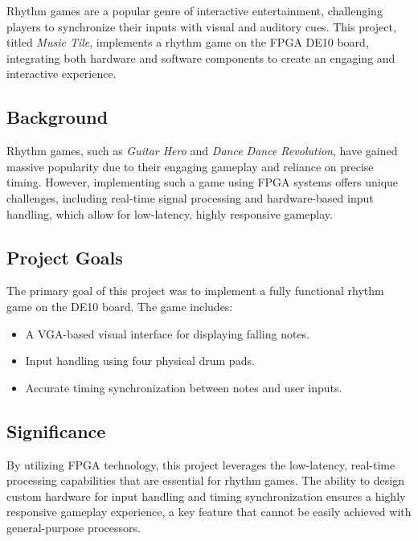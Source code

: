 \documentclass{article}
\begin{document}
Rhythm games are a popular genre of interactive entertainment, challenging players to synchronize their inputs with visual and auditory cues. This project, titled \textit{Music Tile}, implements a rhythm game on the FPGA DE10 board, integrating both hardware and software components to create an engaging and interactive experience.

\subsection{Background}

Rhythm games, such as \textit{Guitar Hero} and \textit{Dance Dance Revolution}, have gained massive popularity due to their engaging gameplay and reliance on precise timing. However, implementing such a game using FPGA systems offers unique challenges, including real-time signal processing and hardware-based input handling, which allow for low-latency, highly responsive gameplay.

\subsection{Project Goals}

The primary goal of this project was to implement a fully functional rhythm game on the DE10 board. The game includes:
\begin{itemize}
    \item A VGA-based visual interface for displaying falling notes.
    \item Input handling using four physical drum pads.
    \item Accurate timing synchronization between notes and user inputs.
\end{itemize}

\subsection{Significance}

By utilizing FPGA technology, this project leverages the low-latency, real-time processing capabilities that are essential for rhythm games. The ability to design custom hardware for input handling and timing synchronization ensures a highly responsive gameplay experience, a key feature that cannot be easily achieved with general-purpose processors.
\end{document}
